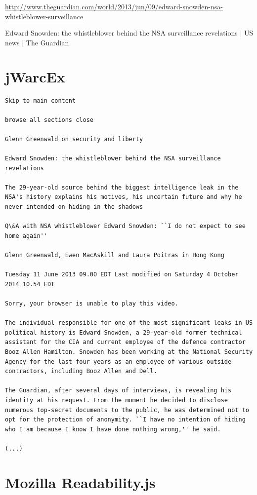 \documentclass[a4paper,12pt,titlepage=false]{scrreprt}
\begin{document}
\scriptsize
\vspace{.1cm}
\url{http://www.theguardian.com/world/2013/jun/09/edward-snowden-nsa-whistleblower-surveillance}

\scriptsize
Edward Snowden: the whistleblower behind the NSA surveillance revelations $|$ US news $|$ The Guardian

\section{jWarcEx}

\begin{lstlisting}[breaklines=true]
Skip to main content

browse all sections close

Glenn Greenwald on security and liberty

Edward Snowden: the whistleblower behind the NSA surveillance revelations

The 29-year-old source behind the biggest intelligence leak in the NSA's history explains his motives, his uncertain future and why he never intended on hiding in the shadows

Q\&A with NSA whistleblower Edward Snowden: ``I do not expect to see home again''

Glenn Greenwald, Ewen MacAskill and Laura Poitras in Hong Kong

Tuesday 11 June 2013 09.00 EDT Last modified on Saturday 4 October 2014 10.54 EDT

Sorry, your browser is unable to play this video.

The individual responsible for one of the most significant leaks in US political history is Edward Snowden, a 29-year-old former technical assistant for the CIA and current employee of the defence contractor Booz Allen Hamilton. Snowden has been working at the National Security Agency for the last four years as an employee of various outside contractors, including Booz Allen and Dell.

The Guardian, after several days of interviews, is revealing his identity at his request. From the moment he decided to disclose numerous top-secret documents to the public, he was determined not to opt for the protection of anonymity. ``I have no intention of hiding who I am because I know I have done nothing wrong,'' he said.

(...)
\end{lstlisting}

\section{Mozilla Readability.js}
\end{document}

